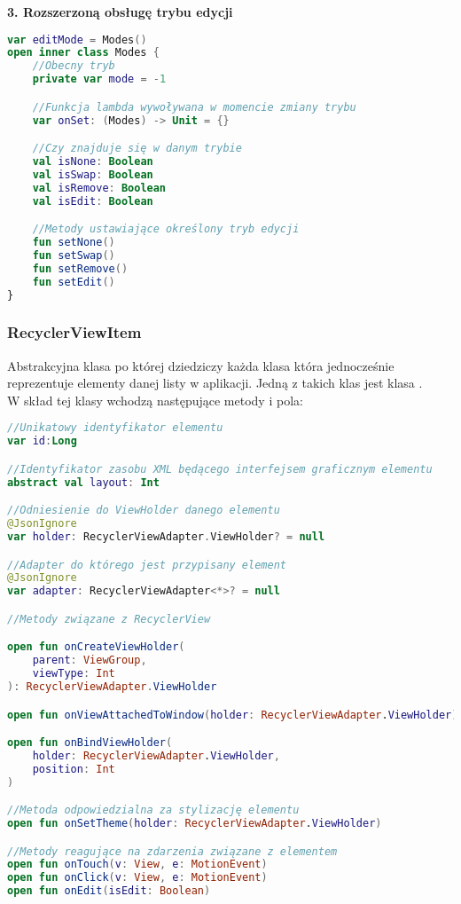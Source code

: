 \vspace{1em}

\textbf{3. Rozszerzoną obsługę trybu edycji}

\begin{lstlisting}[language=Kotlin]
var editMode = Modes()
open inner class Modes {
    //Obecny tryb
    private var mode = -1

    //Funkcja lambda wywoływana w momencie zmiany trybu
    var onSet: (Modes) -> Unit = {}

    //Czy znajduje się w danym trybie
    val isNone: Boolean
    val isSwap: Boolean
    val isRemove: Boolean
    val isEdit: Boolean

    //Metody ustawiające określony tryb edycji
    fun setNone()
    fun setSwap()
    fun setRemove()
    fun setEdit()
}
\end{lstlisting}

\subsubsection{RecyclerViewItem}
Abstrakcyjna klasa po której dziedziczy każda klasa która jednocześnie reprezentuje elementy danej listy w aplikacji. Jedną z takich klas jest klasa .\\

W skład tej klasy wchodzą następujące metody i pola:
\begin{lstlisting}[language=Kotlin]
//Unikatowy identyfikator elementu
var id:Long

//Identyfikator zasobu XML będącego interfejsem graficznym elementu
abstract val layout: Int

//Odniesienie do ViewHolder danego elementu
@JsonIgnore
var holder: RecyclerViewAdapter.ViewHolder? = null

//Adapter do którego jest przypisany element
@JsonIgnore
var adapter: RecyclerViewAdapter<*>? = null

//Metody związane z RecyclerView

open fun onCreateViewHolder(
    parent: ViewGroup,
    viewType: Int
): RecyclerViewAdapter.ViewHolder

open fun onViewAttachedToWindow(holder: RecyclerViewAdapter.ViewHolder)

open fun onBindViewHolder(
    holder: RecyclerViewAdapter.ViewHolder,
    position: Int
)

//Metoda odpowiedzialna za stylizację elementu
open fun onSetTheme(holder: RecyclerViewAdapter.ViewHolder)

//Metody reagujące na zdarzenia związane z elementem
open fun onTouch(v: View, e: MotionEvent)
open fun onClick(v: View, e: MotionEvent)
open fun onEdit(isEdit: Boolean)
\end{lstlisting}

